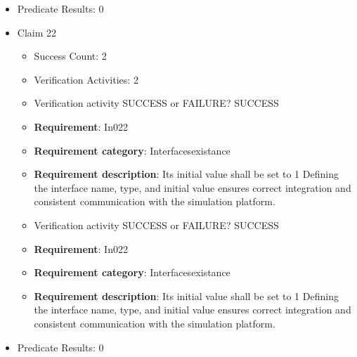 \documentclass{article}
\begin{document}
\begin{itemize}
\begin{itemize}
					\item Verification activity SUCCESS or FAILURE? SUCCESS
		
						\item \textbf{Requirement}: In021 
						\item \textbf{Requirement category}: Interfacesexistance 
						\item \textbf{Requirement description}: Its initial value shall be set to 0 Defining the interface name, type, and initial value ensures correct integration and consistent communication with the simulation platform.
					
				\end{itemize}
				
									    
				\item Predicate Results: 0

  				  \item Claim 22
				\begin{itemize}
			    	\item Success Count: 2 
			    	\item Verification Activities: 2
					\item Verification activity SUCCESS or FAILURE? SUCCESS
		
						\item \textbf{Requirement}: In022 
						\item \textbf{Requirement category}: Interfacesexistance 
						\item \textbf{Requirement description}: Its initial value shall be set to 1 Defining the interface name, type, and initial value ensures correct integration and consistent communication with the simulation platform.
					
					\item Verification activity SUCCESS or FAILURE? SUCCESS
		
						\item \textbf{Requirement}: In022 
						\item \textbf{Requirement category}: Interfacesexistance 
						\item \textbf{Requirement description}: Its initial value shall be set to 1 Defining the interface name, type, and initial value ensures correct integration and consistent communication with the simulation platform.
					
				\end{itemize}
				
									    
				\item Predicate Results: 0


\end{itemize}
\end{document}
